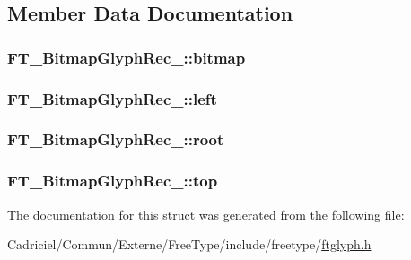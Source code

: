 \subsection{Member Data Documentation}
\hypertarget{struct_f_t___bitmap_glyph_rec___a16ecd0725920f8d5ad4c14e9448126ad}{
\subsubsection[{bitmap}]{ F\-T\-\_\-\-Bitmap\-Glyph\-Rec\-\_\-\-::bitmap}}\label{struct_f_t___bitmap_glyph_rec___a16ecd0725920f8d5ad4c14e9448126ad}
\hypertarget{struct_f_t___bitmap_glyph_rec___a6cfd2d89af7b6be4af886047c9cb7e0a}{
\subsubsection[{left}]{ F\-T\-\_\-\-Bitmap\-Glyph\-Rec\-\_\-\-::left}}\label{struct_f_t___bitmap_glyph_rec___a6cfd2d89af7b6be4af886047c9cb7e0a}
\hypertarget{struct_f_t___bitmap_glyph_rec___ac3970353fbc0fe3d4c59c3fd608140f3}{
\subsubsection[{root}]{ F\-T\-\_\-\-Bitmap\-Glyph\-Rec\-\_\-\-::root}}\label{struct_f_t___bitmap_glyph_rec___ac3970353fbc0fe3d4c59c3fd608140f3}
\hypertarget{struct_f_t___bitmap_glyph_rec___a25fc81296678d6a2d064843c01bc05f7}{
\subsubsection[{top}]{ F\-T\-\_\-\-Bitmap\-Glyph\-Rec\-\_\-\-::top}}\label{struct_f_t___bitmap_glyph_rec___a25fc81296678d6a2d064843c01bc05f7}


The documentation for this struct was generated from the following file\-:\begin{DoxyCompactItemize}
\item 
Cadriciel/\-Commun/\-Externe/\-Free\-Type/include/freetype/\hyperlink{ftglyph_8h}{ftglyph.\-h}\end{DoxyCompactItemize}
